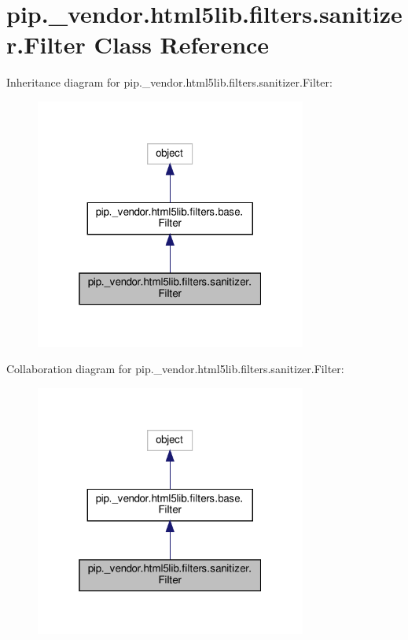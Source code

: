 \hypertarget{classpip_1_1__vendor_1_1html5lib_1_1filters_1_1sanitizer_1_1Filter}{}\section{pip.\+\_\+vendor.\+html5lib.\+filters.\+sanitizer.\+Filter Class Reference}
\label{classpip_1_1__vendor_1_1html5lib_1_1filters_1_1sanitizer_1_1Filter}


Inheritance diagram for pip.\+\_\+vendor.\+html5lib.\+filters.\+sanitizer.\+Filter\+:
\nopagebreak
\begin{figure}[H]
\begin{center}
\leavevmode
\includegraphics[width=253pt]{classpip_1_1__vendor_1_1html5lib_1_1filters_1_1sanitizer_1_1Filter__inherit__graph}
\end{center}
\end{figure}


Collaboration diagram for pip.\+\_\+vendor.\+html5lib.\+filters.\+sanitizer.\+Filter\+:
\nopagebreak
\begin{figure}[H]
\begin{center}
\leavevmode
\includegraphics[width=253pt]{classpip_1_1__vendor_1_1html5lib_1_1filters_1_1sanitizer_1_1Filter__coll__graph}
\end{center}
\end{figure}
